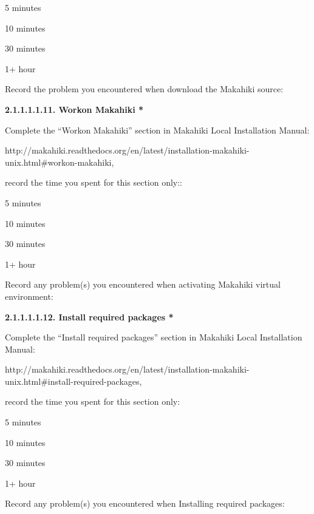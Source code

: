 \begin{radiobutton}
\item 5 minutes
\item  10 minutes
\item  30 minutes
\item  1+ hour
\end{radiobutton}

Record the problem you encountered when download the Makahiki source: \underline{\hspace{3cm}}

{\bf 2.1.1.1.1.11. Workon Makahiki *}

Complete the ``Workon Makahiki'' section in Makahiki Local Installation Manual:

http://makahiki.readthedocs.org/en/latest/installation-makahiki-unix.html\#workon-makahiki, 

record the time you spent for this section only::

\begin{radiobutton}
\item 5 minutes
\item  10 minutes
\item  30 minutes
\item  1+ hour
\end{radiobutton}

Record any problem(s) you encountered when activating Makahiki virtual environment: 

\underline{\hspace{4cm}}

{\bf 2.1.1.1.1.12. Install required packages *}

Complete the ``Install required packages'' section in Makahiki Local Installation Manual:

http://makahiki.readthedocs.org/en/latest/installation-makahiki-unix.html\#install-required-packages, 

record the time you spent for this section only:

\begin{radiobutton}
\item 5 minutes
\item  10 minutes
\item  30 minutes
\item  1+ hour
\end{radiobutton}

Record any problem(s) you encountered when Installing required packages: \underline{\hspace{3cm}}

